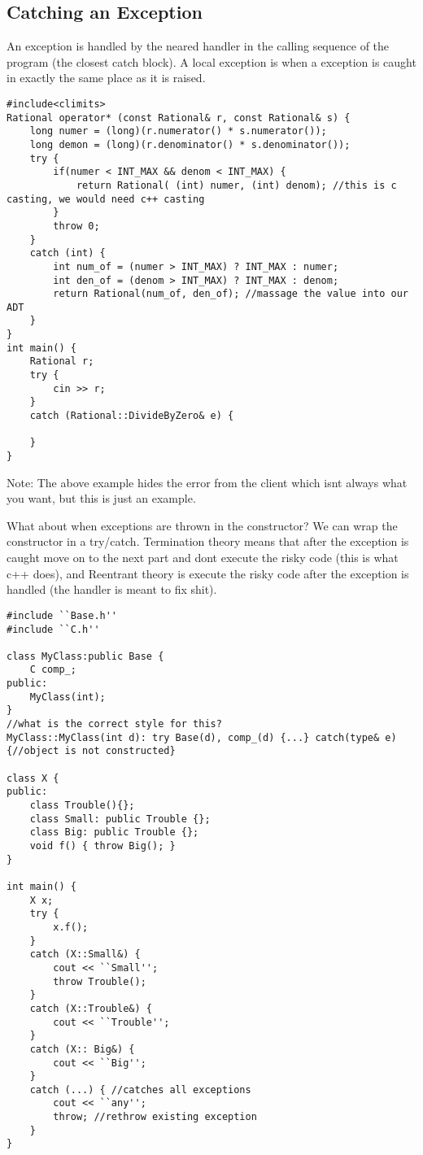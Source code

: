 \documentclass[12pt]{article}
\begin{document}
\subsection*{Catching an Exception}
An exception is handled by the neared handler in the calling sequence of the program (the closest catch block). A local exception is when a exception is caught in exactly the same place as it is raised.

\begin{verbatim}
#include<climits>
Rational operator* (const Rational& r, const Rational& s) {
    long numer = (long)(r.numerator() * s.numerator());
    long demon = (long)(r.denominator() * s.denominator());
    try {
        if(numer < INT_MAX && denom < INT_MAX) {
            return Rational( (int) numer, (int) denom); //this is c casting, we would need c++ casting
        }
        throw 0;
    }
    catch (int) {
        int num_of = (numer > INT_MAX) ? INT_MAX : numer;
        int den_of = (denom > INT_MAX) ? INT_MAX : denom;
        return Rational(num_of, den_of); //massage the value into our ADT
    }
}
int main() {
    Rational r;
    try {
        cin >> r;
    }
    catch (Rational::DivideByZero& e) {

    }
}
\end{verbatim}
Note: The above example hides the error from the client which isnt always what you want, but this is just an example.

What about when exceptions are thrown in the constructor? We can wrap the constructor in a try/catch. Termination theory means that after the exception is caught move on to the next part and dont execute the risky code (this is what  c++ does), and Reentrant theory is execute the risky code after the exception is handled (the handler is meant to fix shit).
\begin{verbatim}
#include ``Base.h''
#include ``C.h''

class MyClass:public Base {
    C comp_;
public:
    MyClass(int);
}
//what is the correct style for this?
MyClass::MyClass(int d): try Base(d), comp_(d) {...} catch(type& e){//object is not constructed}

class X {
public:
    class Trouble(){};
    class Small: public Trouble {};
    class Big: public Trouble {};
    void f() { throw Big(); }
}

int main() {
    X x;
    try {
        x.f();
    }
    catch (X::Small&) {
        cout << ``Small'';
        throw Trouble();
    }
    catch (X::Trouble&) {
        cout << ``Trouble'';
    }
    catch (X:: Big&) {
        cout << ``Big'';
    }
    catch (...) { //catches all exceptions
        cout << ``any'';
        throw; //rethrow existing exception
    }
}
\end{verbatim}
\end{document}
